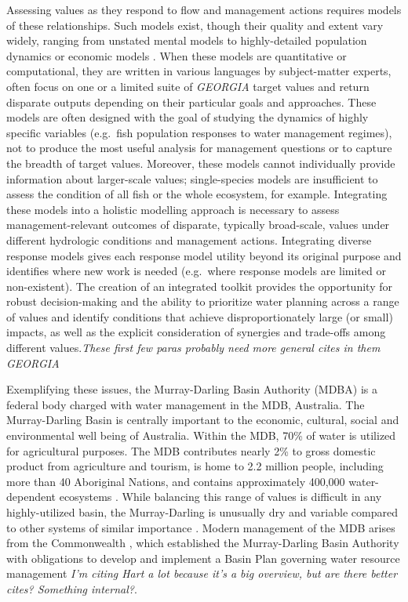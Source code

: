 \documentclass[
  number]{elsarticle}
\begin{document}
Assessing values as they respond to flow and management actions requires
models of these relationships. Such models exist, though their quality
and extent vary widely, ranging from unstated mental models to
highly-detailed population dynamics or economic models
\citep{lester2019}. When these models are quantitative or computational,
they are written in various languages by subject-matter experts, often
focus on one or a limited suite of \emph{GEORGIA} target values and
return disparate outputs depending on their particular goals and
approaches. These models are often designed with the goal of studying
the dynamics of highly specific variables (e.g.~fish population
responses to water management regimes), not to produce the most useful
analysis for management questions or to capture the breadth of target
values. Moreover, these models cannot individually provide information
about larger-scale values; single-species models are insufficient to
assess the condition of all fish or the whole ecosystem, for example.
Integrating these models into a holistic modelling approach is necessary
to assess management-relevant outcomes of disparate, typically
broad-scale, values under different hydrologic conditions and management
actions. Integrating diverse response models gives each response model
utility beyond its original purpose and identifies where new work is
needed (e.g.~where response models are limited or non-existent). The
creation of an integrated toolkit provides the opportunity for robust
decision-making \citep{harrison2023} and the ability to prioritize water
planning across a range of values and identify conditions that achieve
disproportionately large (or small) impacts, as well as the explicit
consideration of synergies and trade-offs among different
values.\emph{These first few paras probably need more general cites in
them GEORGIA}

Exemplifying these issues, the Murray-Darling Basin Authority (MDBA) is
a federal body charged with water management in the MDB, Australia. The
Murray-Darling Basin is centrally important to the economic, cultural,
social and environmental well being of Australia. Within the MDB, 70\%
of water is utilized for agricultural purposes. The MDB contributes
nearly 2\% to gross domestic product from agriculture and tourism, is
home to 2.2 million people, including more than 40 Aboriginal Nations,
and contains approximately 400,000 water-dependent ecosystems
\citep{hart2021}. While balancing this range of values is difficult in
any highly-utilized basin, the Murray-Darling is unusually dry and
variable compared to other systems of similar importance
\citep{hart2021}. Modern management of the MDB arises from the
Commonwealth \citep{wateract2007}, which established the Murray-Darling
Basin Authority with obligations to develop and implement a Basin Plan
governing water resource management \citep{hart2021} \emph{I'm citing
Hart a lot because it's a big overview, but are there better cites?
Something internal?}.
\end{document}

